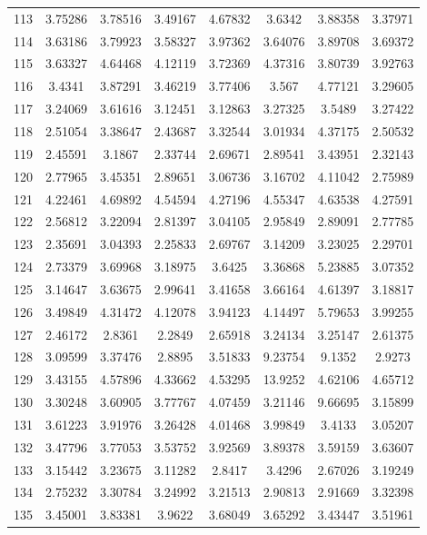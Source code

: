\begin{figure}
\begin{tabular}{cccccccc}
113 & 3.75286 & 3.78516 & 3.49167 & 4.67832 & 3.6342 & 3.88358 & 3.37971\\
114 & 3.63186 & 3.79923 & 3.58327 & 3.97362 & 3.64076 & 3.89708 & 3.69372\\
115 & 3.63327 & 4.64468 & 4.12119 & 3.72369 & 4.37316 & 3.80739 & 3.92763\\
116 & 3.4341 & 3.87291 & 3.46219 & 3.77406 & 3.567 & 4.77121 & 3.29605\\
117 & 3.24069 & 3.61616 & 3.12451 & 3.12863 & 3.27325 & 3.5489 & 3.27422\\
118 & 2.51054 & 3.38647 & 2.43687 & 3.32544 & 3.01934 & 4.37175 & 2.50532\\
119 & 2.45591 & 3.1867 & 2.33744 & 2.69671 & 2.89541 & 3.43951 & 2.32143\\
120 & 2.77965 & 3.45351 & 2.89651 & 3.06736 & 3.16702 & 4.11042 & 2.75989\\
121 & 4.22461 & 4.69892 & 4.54594 & 4.27196 & 4.55347 & 4.63538 & 4.27591\\
122 & 2.56812 & 3.22094 & 2.81397 & 3.04105 & 2.95849 & 2.89091 & 2.77785\\
123 & 2.35691 & 3.04393 & 2.25833 & 2.69767 & 3.14209 & 3.23025 & 2.29701\\
124 & 2.73379 & 3.69968 & 3.18975 & 3.6425 & 3.36868 & 5.23885 & 3.07352\\
125 & 3.14647 & 3.63675 & 2.99641 & 3.41658 & 3.66164 & 4.61397 & 3.18817\\
126 & 3.49849 & 4.31472 & 4.12078 & 3.94123 & 4.14497 & 5.79653 & 3.99255\\
127 & 2.46172 & 2.8361 & 2.2849 & 2.65918 & 3.24134 & 3.25147 & 2.61375\\
128 & 3.09599 & 3.37476 & 2.8895 & 3.51833 & 9.23754 & 9.1352 & 2.9273\\
129 & 3.43155 & 4.57896 & 4.33662 & 4.53295 & 13.9252 & 4.62106 & 4.65712\\
130 & 3.30248 & 3.60905 & 3.77767 & 4.07459 & 3.21146 & 9.66695 & 3.15899\\
131 & 3.61223 & 3.91976 & 3.26428 & 4.01468 & 3.99849 & 3.4133 & 3.05207\\
132 & 3.47796 & 3.77053 & 3.53752 & 3.92569 & 3.89378 & 3.59159 & 3.63607\\
133 & 3.15442 & 3.23675 & 3.11282 & 2.8417 & 3.4296 & 2.67026 & 3.19249\\
134 & 2.75232 & 3.30784 & 3.24992 & 3.21513 & 2.90813 & 2.91669 & 3.32398\\
135 & 3.45001 & 3.83381 & 3.9622 & 3.68049 & 3.65292 & 3.43447 & 3.51961\\

\end{tabular}
\end{figure}
